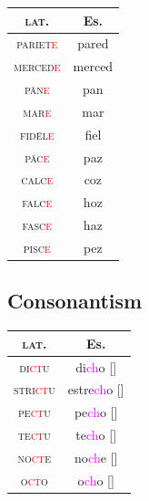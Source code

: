 \documentclass{report}[12pt]
\begin{document}
\begin{tabular}{c c}
  \textsc{lat.} & Es. \\
  \hline
  \textsc{pariet\textcolor{red}{e}} & pared \\
  \textsc{merced\textcolor{red}{e}} & merced \\
  \textsc{p\={a}n\textcolor{red}{e}} & pan \\
  \textsc{mar\textcolor{red}{e}} & mar \\
  \textsc{fid\={e}l\textcolor{red}{e}} & fiel \\
  \textsc{p\={a}c\textcolor{red}{e}} & paz \\
  \textsc{calc\textcolor{red}{e}} & coz \\
  \textsc{falc\textcolor{red}{e}} & hoz \\
  \textsc{fasc\textcolor{red}{e}} & haz \\
  \textsc{pisc\textcolor{red}{e}} & pez \\
\end{tabular}

\subsection{Consonantism}

\begin{tcolorbox}[title=Palatalization of Clusters]

\end{tcolorbox}

\begin{tabular}{c c}
  \textsc{lat.} & Es. \\
  \hline
  \textsc{di\textcolor{red}{ct}u} & di\textcolor{magenta}{ch}o [\textipa{\textteshlig}] \\
  \textsc{stri\textcolor{red}{ct}u} & estre\textcolor{magenta}{ch}o [\textipa{\textteshlig}] \\
  \textsc{pe\textcolor{red}{ct}u} & pe\textcolor{magenta}{ch}o [\textipa{\textteshlig}] \\
  \textsc{te\textcolor{red}{ct}u} & te\textcolor{magenta}{ch}o [\textipa{\textteshlig}] \\
  \textsc{no\textcolor{red}{ct}e} & no\textcolor{magenta}{ch}e [\textipa{\textteshlig}] \\
  \textsc{o\textcolor{red}{ct}o} & o\textcolor{magenta}{ch}o [\textipa{\textteshlig}] \\
\end{tabular}

\begin{tcolorbox}[title=Metathesis]

\end{tcolorbox}
\end{document}

